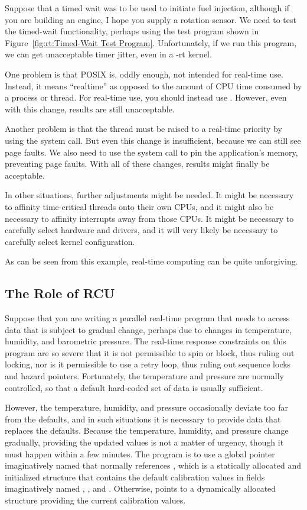 Suppose that a timed wait was to be used to initiate fuel injection,
although if you are building an engine, I hope you supply a rotation
sensor.
We need to test the timed-wait functionality, perhaps using the test program
shown in
Figure~\ref{fig:rt:Timed-Wait Test Program}.
Unfortunately, if we run this program, we can get unacceptable timer
jitter, even in a -rt kernel.

One problem is that POSIX  is, oddly enough, not intended
for real-time use.
Instead, it means ``realtime'' as opposed to the amount of CPU time
consumed by a process or thread.
For real-time use, you should instead use .
However, even with this change, results are still unacceptable.

Another problem is that the thread must be raised to a real-time
priority by using the  system call.
But even this change is insufficient, because we can still see
page faults.
We also need to use the  system call to pin the
application's memory, preventing page faults.
With all of these changes, results might finally be acceptable.

In other situations, further adjustments might be needed.
It might be necessary to affinity time-critical threads onto their
own CPUs, and it might also be necessary to affinity interrupts
away from those CPUs.
It might be necessary to carefully select hardware and drivers,
and it will very likely be necessary to carefully select kernel
configuration.

As can be seen from this example, real-time computing can be quite
unforgiving.

\subsection{The Role of RCU}
\label{sec:rt:The Role of RCU}

Suppose that you are writing a parallel real-time program that needs
to access
data that is subject to gradual change, perhaps due to changes in
temperature, humidity, and barometric pressure.
The real-time response constraints on this program are so severe that
it is not permissible to spin or block, thus ruling out locking,
nor is it permissible to use a retry loop, thus ruling out sequence locks
and hazard pointers.
Fortunately, the temperature and pressure are normally controlled,
so that a default hard-coded set of data is usually sufficient.

However, the temperature, humidity, and pressure occasionally deviate too far
from the defaults, and in such situations it is necessary to provide
data that replaces the defaults.
Because the temperature, humidity, and pressure change gradually,
providing the updated values is not a matter of urgency, though
it must happen within a few minutes.
The program is to use a global pointer imaginatively named 
that normally references , which is a statically allocated
and initialized structure that contains the default calibration values
in fields imaginatively named , , and .
Otherwise,  points to a dynamically allocated
structure providing the current calibration values.

